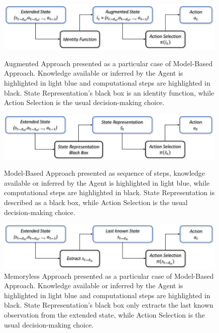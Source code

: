                 \begin{figure}
                    \centering
                    
                    \vspace{1.0cm}
                    \includegraphics[width=15cm, keepaspectratio]{images/dmdp/modelbased_appr_augmented_2.png}
                    \caption{Augmented Approach presented as a particular case of Model-Based Approach. Knowledge available or inferred by the Agent is highlighted in light blue and computational steps are highlighted in black. State Representation's black box is an identity function, while Action Selection is the usual decision-making choice.}
                    \label{fig:modelbased_appr_augmented}
                    
                    \vspace{2.5cm}
                    
                    \includegraphics[width=15cm, keepaspectratio]{images/dmdp/modelbased_appr_modelbased_2.png}
                    \caption{Model-Based Approach presented as sequence of steps, knowledge available or inferred by the Agent is highlighted in light blue, while computational steps are highlighted in black. State Representation is described as a black box, while Action Selection is the usual decision-making choice.}
                    \label{fig:modelbased_appr_modelbased}
                    
                    \vspace{2.5cm}
                    
                    \includegraphics[width=15cm, keepaspectratio]{images/dmdp/modelbased_appr_memoryless_2.png}
                    \caption{Memoryless Approach presented as a particular case of Model-Based Approach. Knowledge available or inferred by the Agent is highlighted in light blue and computational steps are highlighted in black. State Representation's black box only extracts the last known observation from the extended state, while Action Selection is the usual decision-making choice.}
                    \label{fig:modelbased_appr_memoryless}
                    \vspace{1.0cm}
                \end{figure}
        
